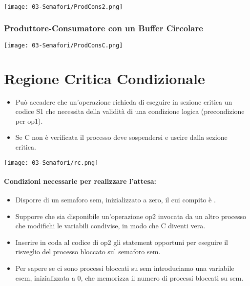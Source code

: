\begin{center}
	\texttt{[image: 03-Semafori/ProdCons2.png]}
\end{center}

\subsubsection{Produttore-Consumatore con un Buffer Circolare}

\begin{center}
	\texttt{[image: 03-Semafori/ProdConsC.png]}
\end{center}


\section{Regione Critica Condizionale}

\begin{itemize}
	\item Può accadere che un'operazione  richieda di eseguire in sezione
	      critica un codice S1 che necessita della validità di una condizione logica  (precondizione per op1).
	\item Se C non è verificata il processo deve sospendersi e uscire dalla sezione critica.
\end{itemize}

\begin{center}
	\texttt{[image: 03-Semafori/rc.png]}
\end{center}

\paragraph{Condizioni necessarie per realizzare l'attesa:}

\begin{itemize}
	\item Disporre di un semaforo sem, inizializzato a zero, il cui compito è .
	\item Supporre che sia disponibile un’operazione
	      op2 invocata da un altro processo che
	      modifichi le variabili condivise, in modo che C
	      diventi vera.
	\item Inserire in coda al codice di op2 gli statement
	      opportuni per eseguire il risveglio del processo
	      bloccato sul semaforo sem.
	\item Per sapere se ci sono processi bloccati su sem
	      introduciamo una variabile csem, inizializzata
	      a 0, che memorizza il numero di processi
	      bloccati su sem.
\end{itemize}

